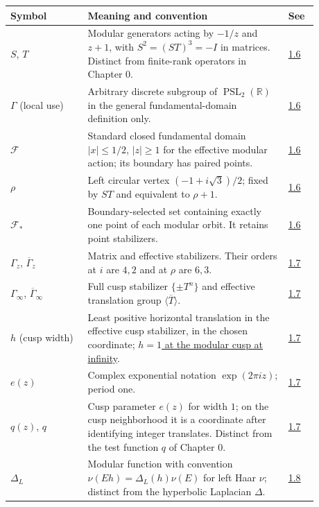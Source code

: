 \begin{longtable}{p{0.22\linewidth}p{0.58\linewidth}p{0.08\linewidth}}
\textbf{Symbol} & \textbf{Meaning and convention} & \textbf{See} \\ \hline
$S$, $T$ & Modular generators acting by $-1/z$ and $z+1$, with $S^2=(ST)^3=-I$ in matrices. Distinct from finite-rank operators in Chapter 0. & \hyperref[modular.generator-relations]{1.6} \\
$\Gamma$ (local use) & Arbitrary discrete subgroup of $\operatorname{PSL}_2(\mathbb R)$ in the general fundamental-domain definition only. & \hyperref[modular.fundamental-domain-definition]{1.6} \\
$\mathcal F$ & Standard closed fundamental domain $|x|\leq1/2$, $|z|\geq1$ for the effective modular action; its boundary has paired points. & \hyperref[modular.fundamental-region]{1.6} \\
$\rho$ & Left circular vertex $(-1+i\sqrt3)/2$; fixed by $ST$ and equivalent to $\rho+1$. & \hyperref[modular.fundamental-region]{1.6} \\
$\mathcal F_*$ & Boundary-selected set containing exactly one point of each modular orbit. It retains point stabilizers. & \hyperref[eq:modular-representative-set]{1.6} \\
$\Gamma_z$, $\overline\Gamma_z$ & Matrix and effective stabilizers. Their orders at $i$ are $4,2$ and at $\rho$ are $6,3$. & \hyperref[modular.elliptic-stabilizers]{1.7} \\
$\Gamma_\infty$, $\overline\Gamma_\infty$ & Full cusp stabilizer $\{\pm T^n\}$ and effective translation group $\langle\overline T\rangle$. & \hyperref[modular.cusp-stabilizer]{1.7} \\
$h$ (cusp width) & Least positive horizontal translation in the effective cusp stabilizer, in the chosen coordinate; \hyperref[modular.cusp-width-one]{$h=1$ at the modular cusp at infinity}. & \hyperref[modular.cusp-width]{1.7} \\
$e(z)$ & Complex exponential notation $\exp(2\pi iz)$; period one. & \hyperref[modular.cusp-parameter]{1.7} \\
$q(z)$, $q$ & Cusp parameter $e(z)$ for width $1$; on the cusp neighborhood it is a coordinate after identifying integer translates. Distinct from the test function $q$ of Chapter 0. & \hyperref[modular.cusp-parameter]{1.7} \\
$\Delta_L$ & Modular function with convention $\nu(Eh)=\Delta_L(h)\nu(E)$ for left Haar $\nu$; distinct from the hyperbolic Laplacian $\Delta$. & \hyperref[measure.unimodular]{1.8} \\

\end{longtable}
